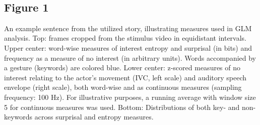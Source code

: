 \documentclass[11pt]{article}
\begin{document}
    \begin{center}
    \end{center}
    { \hspace*{\fill} \\}
    
    \hypertarget{figure-1}{%
\subsection{Figure 1}\label{figure-1}}

An example sentence from the utilized story, illustrating measures used
in GLM analysis. Top: frames cropped from the stimulus video in
equidistant intervals. Upper center: word-wise measures of interest
entropy and surprisal (in bits) and frequency as a measure of no
interest (in arbitrary units). Words accompanied by a gesture (keywords)
are colored blue. Lower center: z-scored measures of no interest
relating to the actor's movement (IVC, left scale) and auditory speech
envelope (right scale), both word-wise and as continuous measures
(sampling frequency: 100 Hz). For illustrative purposes, a running
average with window size 5 for continuous measures was used. Bottom:
Distributions of both key- and non-keywords across surprisal and entropy
measures.


    
    
    
\end{document}

